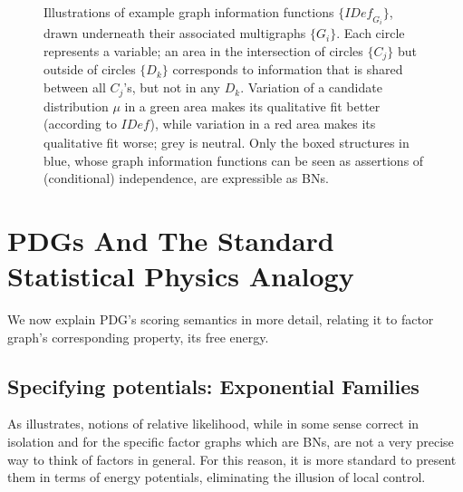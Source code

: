 \documentclass[letterpaper]{article} %
\theoremstyle{plain}
\theoremstyle{definition}
\theoremstyle{remark}
\renewcommand\thesubfigure{(\alph{subfigure})}
\newcommand{\IDef}[1]{\mathit{IDef}_{#1}}
\begin{document}
\begin{vfull}
\begin{figure}
{
}
\addtocounter{figure}{-1} %
\caption{Illustrations of example graph information
	  functions $\{ \IDef{G_i} \}$, drawn underneath their
	  associated multigraphs $\{ G_i\}$. Each circle represents a
	  variable; an area in the intersection of circles $\{C_j\}$
	  but outside of circles $\{D_k\}$ corresponds to information
	  that is shared between all $C_j$'s, but not in any
	  $D_k$. Variation of a candidate distribution $\mu$ in a
	  green area makes its qualitative fit better (according to
	  $\IDef{}$), while variation in a red area makes its
	  qualitative fit worse; grey is neutral. Only the boxed
	  structures in blue, whose graph information functions can be
	  seen as assertions of (conditional) independence, are
	  expressible as BNs.} 

\label{fig:info-diagram}
\end{figure}
\end{vfull}


\section{PDGs And The Standard Statistical Physics Analogy}
We now explain PDG's scoring semantics in more detail, relating it to factor graph's corresponding property, its free energy.

\subsection{Specifying potentials: Exponential
	  Families}\label{sec:fg-expfam}

As  illustrates, notions of relative likelihood, while in some sense correct in isolation and for the specific factor graphs which are BNs, are not a very precise way to think of factors in general. 
For this reason, it is more standard to present them in terms of energy potentials, eliminating the illusion of local control. 
\end{document}
